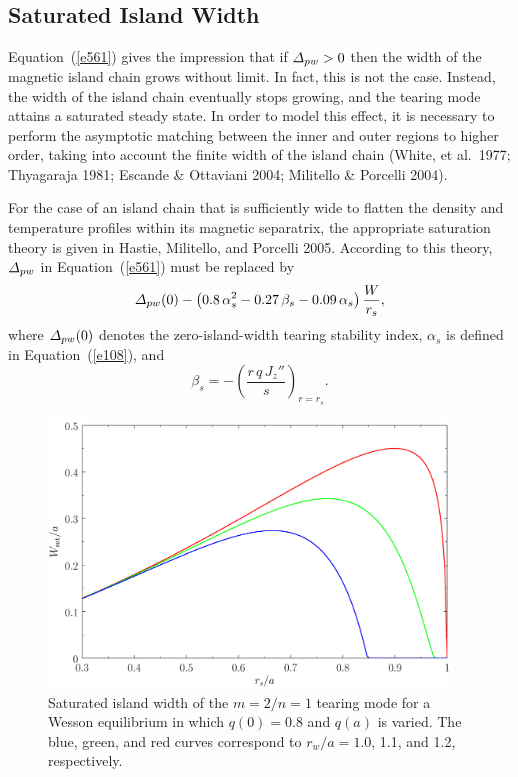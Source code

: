 \documentclass[notitlepage,12pt]{article}
\begin{document}
\subsection{Saturated Island Width}\label{sat}
Equation~(\ref{e561}) gives the impression that if ${\mit\Delta}_{pw}>0$ then the width of the magnetic island chain 
grows without limit. In fact, this is not the case. Instead, the width of the island chain eventually stops growing, and the
tearing mode attains a saturated steady state. In order to model this effect, it is necessary to perform the
asymptotic matching between the inner and outer regions to higher order, taking into account the finite
width of the island chain (White, et al.\ 1977; Thyagaraja 1981; Escande \& Ottaviani 2004; Militello \& Porcelli
2004). 

For the case of an island chain that is sufficiently wide to flatten  the density and temperature profiles within its magnetic separatrix, the appropriate saturation theory is given in Hastie, Militello, and Porcelli 2005.
According to this theory, ${\mit\Delta}_{pw}$ in Equation~(\ref{e561}) must be replaced by
\begin{equation}\label{e562}
{\mit\Delta}_{pw}(0) - \left(0.8\,\alpha_s^{2}-0.27\,\beta_s - 0.09\,\alpha_s\right)\frac{W}{r_s},
\end{equation}
where ${\mit\Delta}_{pw}(0)$ denotes the zero-island-width tearing stability index, $\alpha_s$ is defined in  Equation~(\ref{e108}),
and
\begin{equation}
\beta_s = -\left(\frac{r\,q\,J_z''}{s}\right)_{r=r_s}.
\end{equation}

\begin{figure}[t]
\centerline{\includegraphics[width=0.95\textwidth]{m2n1.pdf}}
\caption{Saturated island width of the $m=2/n=1$ tearing mode for a Wesson equilibrium in which $q(0)=0.8$ and
$q(a)$ is varied. The blue, green, and red curves correspond to $r_w/a= 1.0$, 1.1, and 1.2, respectively.}\label{f7}
\end{figure}
\end{document}
